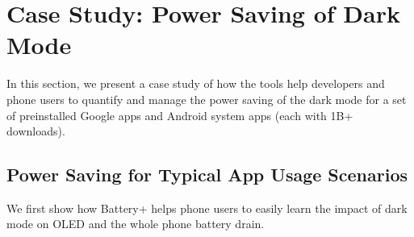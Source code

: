\section{Case Study: Power Saving of Dark Mode}
\label{sec:casedark}



In this section, we present a case study of
how the tools help developers and phone users to quantify and manage
the power saving of the dark mode for a set of preinstalled
Google apps and Android system apps (each with 1B+ downloads).



\subsection{Power Saving for Typical App Usage Scenarios}
\label{subsec:mainresults}

We first show how Battery+ helps phone users to easily learn the
impact of dark mode on OLED and the whole phone battery drain.


